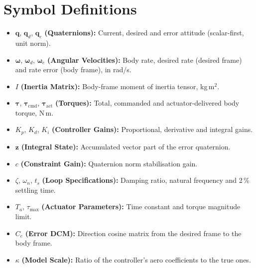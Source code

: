 \documentclass[11pt, a4paper]{article}
\newcommand{\vect}[1]{\boldsymbol{#1}}
\newcommand{\w}{\vect{\omega}}
\begin{document}
\section{Symbol Definitions}

\begin{itemize}
    \item $\vect{q}$, $\vect{q}_d$, $\vect{q}_e$ \textbf{(Quaternions):} Current, desired and error attitude (scalar-first, unit norm).
    \item $\w$, $\w_d$, $\w_e$ \textbf{(Angular Velocities):} Body rate, desired rate (desired frame) and rate error (body frame), in rad/s.
    \item $I$ \textbf{(Inertia Matrix):} Body-frame moment of inertia tensor, kg\,m$^2$.
    \item $\vect{\tau}$, $\vect{\tau}_{\text{cmd}}$, $\vect{\tau}_{\text{act}}$ \textbf{(Torques):} Total, commanded and actuator-delivered body torque, N\,m.
    \item $K_p$, $K_d$, $K_i$ \textbf{(Controller Gains):} Proportional, derivative and integral gains.
    \item $\vect{z}$ \textbf{(Integral State):} Accumulated vector part of the error quaternion.
    \item $c$ \textbf{(Constraint Gain):} Quaternion norm stabilisation gain.
    \item $\zeta$, $\omega_n$, $t_s$ \textbf{(Loop Specifications):} Damping ratio, natural frequency and 2\,\% settling time.
    \item $T_a$, $\tau_{\max}$ \textbf{(Actuator Parameters):} Time constant and torque magnitude limit.
    \item $C_e$ \textbf{(Error DCM):} Direction cosine matrix from the desired frame to the body frame.
    \item $\kappa$ \textbf{(Model Scale):} Ratio of the controller's aero coefficients to the true ones.
\end{itemize}
\end{document}
